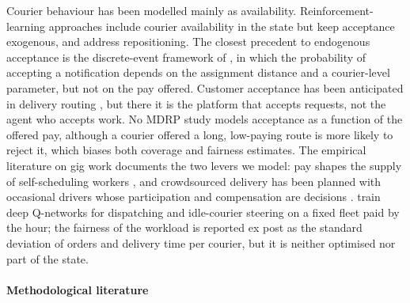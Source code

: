 \documentclass[a4paper,11pt,review,3p,authoryear]{elsarticle}
\begin{document}
Courier behaviour has been modelled mainly as availability. Reinforcement-learning approaches \citep{ahamed2020deep,bozanta2022courier} include courier availability in the state but keep acceptance exogenous, and \cite{haferkamp2023heatmap} address repositioning. The closest precedent to endogenous acceptance is the discrete-event framework of \cite{quintero2020computational}, in which the probability of accepting a notification depends on the assignment distance and a courier-level parameter, but not on the pay offered. Customer acceptance has been anticipated in delivery routing \citep{ULMER2020183}, but there it is the platform that accepts requests, not the agent who accepts work. No MDRP study models acceptance as a function of the offered pay, although a courier offered a long, low-paying route is more likely to reject it, which biases both coverage and fairness estimates. The empirical literature on gig work documents the two levers we model: pay shapes the supply of self-scheduling workers \citep{cachon2017surge,allon2023gig}, and crowdsourced delivery has been planned with occasional drivers whose participation and compensation are decisions \citep{archetti2016occasional,dayarian2020crowdshipping,ulmer2020workforce}. \citet{cheng2025realtime} train deep Q-networks for dispatching and idle-courier steering on a fixed fleet paid by the hour; the fairness of the workload is reported ex post as the standard deviation of orders and delivery time per courier, but it is neither optimised nor part of the state.

\paragraph{Methodological literature}
\end{document}
